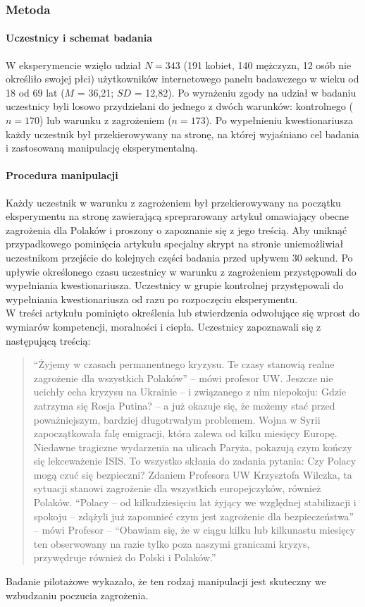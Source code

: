 \documentclass[man]{apa6}
\begin{document}
\subsubsection{Metoda}

\paragraph{Uczestnicy i schemat badania}
W eksperymencie wzięło udział $N=343$ (191 kobiet, 140 mężczyzn, 12 osób nie określiło swojej płci) użytkowników internetowego panelu badawczego w wieku od 18 od 69 lat ($M$ = 36,21; $SD$ = 12,82). Po wyrażeniu zgody na udział w badaniu uczestnicy byli losowo przydzielani do jednego z dwóch warunków: kontrolnego ($n = 170$) lub warunku z zagrożeniem ($n = 173$). Po wypełnieniu kwestionariusza każdy uczestnik był przekierowywany na stronę, na której wyjaśniano cel badania i zastosowaną manipulację eksperymentalną.

\paragraph{Procedura manipulacji}
Każdy uczestnik w warunku z zagrożeniem był przekierowywany na początku eksperymentu na stronę zawierającą spreprarowany artykuł omawiający obecne zagrożenia dla Polaków i proszony o zapoznanie się z jego treścią. Aby uniknąć przypadkowego pominięcia artykułu specjalny skrypt na stronie uniemożliwiał uczestnikom przejście do kolejnych części badania przed upływem 30 sekund. Po upływie określonego czasu uczestnicy w warunku z zagrożeniem przystępowali do wypełniania kwestionariusza. Uczestnicy w grupie kontrolnej przystępowali do wypełniania kwestionariusza od razu po rozpoczęciu eksperymentu. \\
W treści artykułu pominięto określenia lub stwierdzenia odwołujące się wprost do wymiarów kompetencji, moralności i ciepła. Uczestnicy zapoznawali się z następującą treścią:
\blockquote{``Żyjemy w czasach permanentnego kryzysu. Te czasy stanowią realne zagrożenie dla wszystkich Polaków'' -- mówi profesor UW. Jeszcze nie ucichły echa kryzysu na Ukrainie -- i związanego z nim niepokoju: Gdzie zatrzyma się Rosja Putina? -- a już okazuje się, że możemy stać przed poważniejszym, bardziej długotrwałym problemem. Wojna w Syrii zapoczątkowała falę emigracji, która zalewa od kilku miesięcy Europę. Niedawne tragiczne wydarzenia na ulicach Paryża, pokazują czym kończy się lekceważenie ISIS. To wszystko skłania do zadania pytania: Czy Polacy mogą czuć się bezpieczni? Zdaniem Profesora UW Krzysztofa Wilczka, ta sytuacji stanowi zagrożenie dla wszystkich europejczyków, również Polaków. ``Polacy -- od kilkudziesięciu lat żyjący we względnej stabilizacji i spokoju -- zdążyli już zapomnieć czym jest zagrożenie dla bezpieczeństwa'' -- mówi Profesor -- ``Obawiam się, że w ciągu kilku lub kilkunastu miesięcy ten obserwowany na razie tylko poza naszymi granicami kryzys, przywędruje również do Polski i Polaków.''}
Badanie pilotażowe wykazało, że ten rodzaj manipulacji jest skuteczny we wzbudzaniu poczucia zagrożenia.
\end{document}
